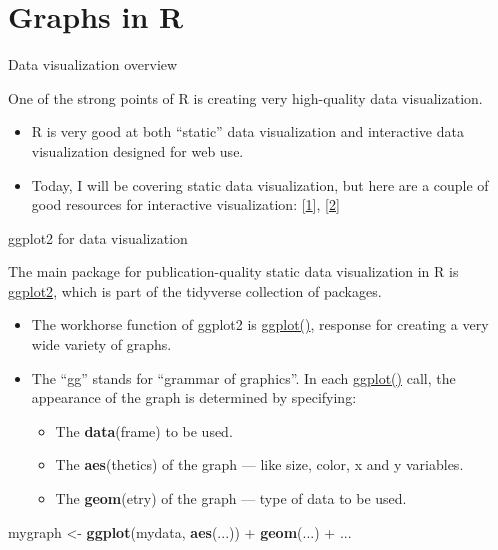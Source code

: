 \documentclass[ignorenonframetext,]{beamer}
\newenvironment{Shaded}{\begin{snugshade}}{\end{snugshade}}
\newcommand{\KeywordTok}[1]{\textcolor[rgb]{0.26,0.66,0.93}{\textbf{#1}}}
\newcommand{\StringTok}[1]{\textcolor[rgb]{0.02,0.61,0.04}{#1}}
\newcommand{\OperatorTok}[1]{\textcolor[rgb]{0.74,0.68,0.62}{#1}}
\newcommand{\NormalTok}[1]{\textcolor[rgb]{0.74,0.68,0.62}{#1}}
\providecommand{\tightlist}{%
  \setlength{\itemsep}{0pt}\setlength{\parskip}{0pt}}
\begin{document}
\section{Graphs in R}\label{graphs-in-r}

\begin{frame}{Data visualization overview}

One of the strong points of R is creating very high-quality data
visualization.

\begin{itemize}
\item
  R is very good at both ``static'' data visualization and interactive
  data visualization designed for web use.
\item
  Today, I will be covering static data visualization, but here are a
  couple of good resources for interactive visualization:
  {[}\href{http://www.rebeccabarter.com/blog/2017-04-20-interactive/}{1}{]},
  {[}\href{https://www.r-graph-gallery.com/get-the-best-from-ggplotly/}{2}{]}
\end{itemize}

\end{frame}

\begin{frame}[fragile]{ggplot2 for data visualization}

The main package for publication-quality static data visualization in R
is \href{https://www.rdocumentation.org/packages/ggplot2}{ggplot2},
which is part of the tidyverse collection of packages.

\begin{itemize}
\item
  The workhorse function of ggplot2 is
  \href{https://www.rdocumentation.org/packages/ggplot2/versions/2.2.1/topics/ggplot}{ggplot()},
  response for creating a very wide variety of graphs.
\item
  The ``gg'' stands for ``grammar of graphics''. In each
  \href{https://www.rdocumentation.org/packages/ggplot2/versions/2.2.1/topics/ggplot}{ggplot()}
  call, the appearance of the graph is determined by specifying:

  \begin{itemize}
  \tightlist
  \item
    The \textbf{data}(frame) to be used.
  \item
    The \textbf{aes}(thetics) of the graph --- like size, color, x and y
    variables.
  \item
    The \textbf{geom}(etry) of the graph --- type of data to be used.
  \end{itemize}
\end{itemize}

\begin{Shaded}
\begin{Highlighting}[]
\NormalTok{mygraph <-}\StringTok{ }\KeywordTok{ggplot}\NormalTok{(mydata, }\KeywordTok{aes}\NormalTok{(...)) }\OperatorTok{+}\StringTok{ }\KeywordTok{geom}\NormalTok{(...) }\OperatorTok{+}\StringTok{ }\NormalTok{... }
\end{Highlighting}
\end{Shaded}

\end{frame}
\end{document}
